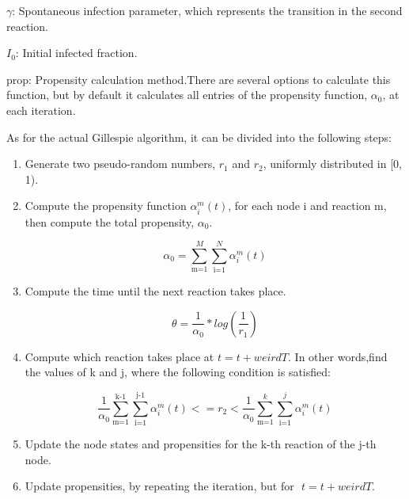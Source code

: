 \documentclass{article}
\begin{document}
$\gamma$: ‌‌Spontaneous‌ ‌infection‌ ‌parameter,‌ ‌which‌ ‌represents‌ ‌the‌ ‌transition‌ ‌in‌ ‌the‌ ‌second‌ ‌reaction.‌

$I_0$: Initial‌ ‌infected‌ ‌fraction.‌ ‌

‌prop: Propensity‌‌ calculation ‌‌method.‌‌There‌‌ are ‌‌several ‌‌options‌‌ to ‌‌calculate‌‌ this‌‌ function,‌‌ but‌‌ by‌ ‌default‌ ‌it‌ ‌calculates‌ ‌all‌ ‌entries‌ ‌of‌ ‌the‌ ‌propensity‌ ‌function,‌ $\alpha_0$,‌ ‌at‌ ‌each‌ ‌iteration.

As‌ ‌for‌ ‌the‌ ‌actual‌ ‌Gillespie‌ ‌algorithm,‌ ‌it‌ ‌can‌ ‌be‌ ‌divided‌ ‌into‌ ‌the‌ ‌following‌ ‌steps:‌‌

\begin{enumerate} %
    \item Generate‌ ‌two‌ ‌pseudo-random‌ ‌numbers,‌ $r_1$ and‌ ‌$r_2$,‌ ‌uniformly‌ ‌distributed‌ ‌in‌ ‌[0,‌ ‌1).
    \item Compute‌ ‌the‌ ‌propensity‌ ‌function‌ ‌$\alpha _i^m(t)$,‌ ‌for‌ ‌each‌ ‌node‌ ‌i‌ ‌and ‌‌reaction‌‌ m, ‌‌then‌‌ compute‌‌ the‌ ‌total‌ ‌propensity‌, $\alpha_0$.‌
    
        \begin{equation}
            \alpha_0 = \sum_\text{m=1}^M \sum_\text{i=1}^N \alpha_i^m(t)
        \end{equation}

    \item Compute‌ ‌the‌ ‌time‌ ‌until‌ ‌the‌ ‌next‌ ‌reaction‌ ‌takes‌ ‌place.‌
    
        \begin{equation} %
            \theta = \frac{1}{\alpha_0} * log(\frac{1}{r_1})
        \end{equation}

    \item Compute‌ ‌which‌ ‌reaction‌ ‌takes‌ ‌place‌ ‌at‌ ‌$t = t + weirdT$.‌ ‌In‌ ‌other‌‌ words,‌‌find ‌‌the ‌‌values ‌‌of ‌‌k‌‌ and‌ ‌j,‌ ‌where‌ ‌the‌ ‌following‌ ‌condition‌ ‌is‌ ‌satisfied:‌ ‌%

        \begin{equation}
            \frac{1}{\alpha_0} \sum_\text{m=1}^\text{k-1} \sum_\text{i=1}^\text{j-1} \alpha_i^m(t) <= r_2 < \frac{1}{\alpha_0} \sum_\text{m=1}^k \sum_\text{i=1}^j \alpha_i^m(t) 
        \end{equation}

    \item Update‌ ‌the‌ ‌node‌ ‌states‌ ‌and‌ ‌propensities‌ ‌for‌ ‌the‌ ‌k-th‌ ‌reaction‌ ‌of‌ ‌the‌ ‌j-th‌ ‌node.‌ ‌
    \item Update‌ ‌propensities,‌ ‌by‌ ‌repeating‌ ‌the‌ ‌iteration,‌ ‌but‌ ‌for‌ ‌ ‌$t = t + weirdT$.‌
\end{enumerate}
\end{document}
